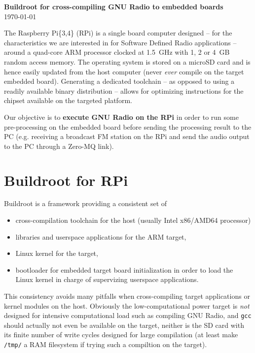 \documentclass[a4paper]{article}
\begin{document}
\begin{center}
{\bf\Large Buildroot for cross-compiling GNU Radio to embedded boards}\\
\today
\end{center}
The Raspberry Pi\{3,4\} (RPi) is a single board computer designed -- for the characteristics
we are interested in for Software Defined Radio applications -- around a 
quad-core ARM processor clocked at 1.5~GHz with 1, 2 or 4~GB random access memory.
The operating system is stored on a microSD card and is hence easily updated
from the host computer (never {\em ever} compile on the target embedded board). Generating
a dedicated toolchain -- as opposed to using a readily available binary distribution --
allows for optimizing instructions for the chipset available on the targeted platform.

Our objective is to {\bf execute GNU Radio on the RPi} in order to run some
pre-processing on the embedded board before sending the processing result to
the PC (e.g. receiving a broadcast FM station on the RPi and send the audio
output to the PC through a Zero-MQ link).

\section{Buildroot for RPi}

Buildroot is a framework providing a consistent set of
\begin{itemize}
\item cross-compilation toolchain for the host (usually Intel x86/AMD64 processor)
\item libraries and userspace applications for the ARM target,
\item Linux kernel for the target,
\item bootloader for embedded target board initialization in order to load the Linux
kernel in charge of supervizing userspace applications.
\end{itemize}

This consistency avoids many pitfalls when cross-compiling target applications 
or kernel modules on the host. Obviously the low-computational power target is 
{\em not} designed for intensive computational load such as compiling GNU Radio, and
{\tt gcc} should actually not even be available on the target, neither is the SD
card with its finite number of write cycles designed for large compilation (at least
make {\tt /tmp/} a RAM filesystem if trying such a compiltion on the target).
\end{document}
